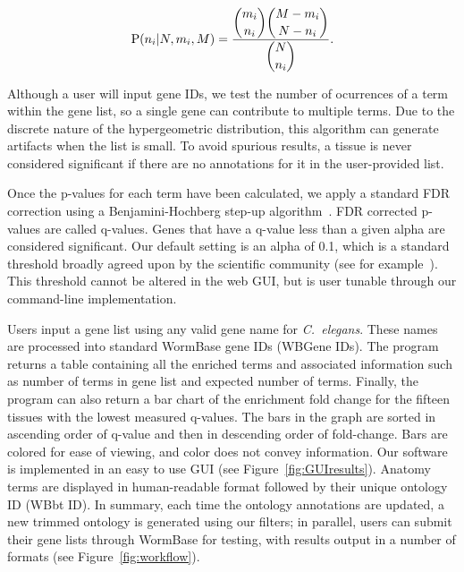 \begin{eqnarray}\label{hypergeometric}
	\mathrm{P}(n_i | N, m_i, M) = \frac{\dbinom{m_i}{n_i}
  \dbinom{M-m_i}{N - n_i}}{\dbinom{N}{n_i}}\text{.}
\end{eqnarray}

Although a user will input gene IDs, we test the number of ocurrences of a term
within the gene list, so a single gene can contribute to multiple terms. Due to
the discrete nature of the hypergeometric distribution, this algorithm can
generate artifacts when the list is small. To avoid spurious results, a tissue is
never considered significant if there are no annotations for it in the
user-provided list.

Once the p-values for each term have been calculated, we apply a standard FDR
correction using a Benjamini-Hochberg step-up algorithm~\cite{Benjamini1995}.
FDR corrected p-values are called q-values. Genes that have a q-value less than
a given alpha are considered significant. Our default setting is an alpha of 0.1,
which is a standard threshold broadly agreed upon by the scientific community
(see for example~\cite{Love2014, Pawitan2005, Storey2003}). This threshold cannot
be altered in the web GUI, but is user tunable through our command-line
implementation.

Users input a gene list using any valid gene name for \emph{C.~elegans}. These
names are processed into standard WormBase gene IDs (WBGene IDs). The program
returns a table containing all the enriched terms and associated  information
such as number of terms in gene list and expected number of terms. Finally, the
program can also return a bar chart of the enrichment fold change for the fifteen
tissues with the lowest measured q-values. The bars in the graph are sorted in
ascending order of q-value and then in descending order of fold-change. Bars are
colored for ease of viewing, and color does not convey information. Our software
is implemented in an easy to use GUI (see Figure~\ref{fig:GUIresults}). Anatomy
terms are displayed in human-readable format followed by their unique ontology
ID (WBbt ID). In summary, each time the ontology annotations are updated, a new
trimmed ontology is generated using our filters; in parallel, users can submit
their gene lists through WormBase for testing, with results output in a number
of formats (see Figure~\ref{fig:workflow}).

